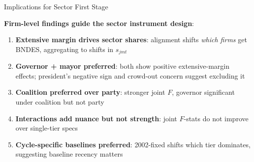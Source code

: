 \documentclass[aspectratio=169,11pt]{beamer}
\begin{document}
\begin{frame}{Implications for Sector First Stage}

\textbf{Firm-level findings guide the sector instrument design}:

\medskip

\begin{enumerate}
    \item \textbf{Extensive margin drives sector shares}: alignment shifts \emph{which firms} get BNDES, aggregating to shifts in $s_{jmt}$

    \item \textbf{Governor + mayor preferred}: both show positive extensive-margin effects; president's negative sign and crowd-out concern suggest excluding it

    \item \textbf{Coalition preferred over party}: stronger joint $F$, governor significant under coalition but not party

    \item \textbf{Interactions add nuance but not strength}: joint $F$-stats do not improve over single-tier specs

    \item \textbf{Cycle-specific baselines preferred}: 2002-fixed shifts which tier dominates, suggesting baseline recency matters
\end{enumerate}

\end{frame}
\end{document}
